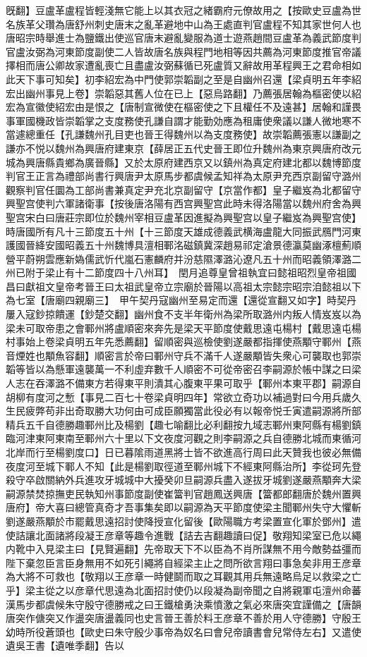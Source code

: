 旣翻】豆盧革盧程皆輕淺無它能上以其衣冠之緒霸府元僚故用之【按歐史豆盧為世名族革父瓚為唐舒州刺史唐末之亂革避地中山為王處直判官盧程不知其家世何人也唐昭宗時舉進士為鹽鐵出使巡官唐末避亂變服為道士遊燕趙間豆盧革為義武節度判官盧汝弼為河東節度副使二人皆故唐名族與程門地相等因共薦為河東節度推官帝議擇相而唐公卿故家遭亂喪亡且盡盧汝弼蘇循已死盧質又辭故用革程興王之君命相如此天下事可知矣】初李紹宏為中門使郭崇韜副之至是自幽州召還【梁貞明五年李紹宏出幽州事見上卷】崇韜惡其舊人位在已上【惡烏路翻】乃薦張居翰為樞密使以紹宏為宣徽使紹宏由是恨之【唐制宣微使在樞密使之下且權任不及遠甚】居翰和謹畏事軍國機政皆崇韜掌之支度務使孔謙自謂才能勤効應為租庸使衆議以謙人微地寒不當遽總重任【孔謙魏州孔目吏也晉王得魏州以為支度務使】故崇韜薦張憲以謙副之謙亦不悦以魏州為興唐府建東京【薛居正五代史晉王即位升魏州為東京興唐府改元城為興唐縣貴鄉為廣晉縣】又於太原府建西京又以鎮州為真定府建北都以魏博節度判官王正言為禮部尚書行興唐尹太原馬步都虞候孟知祥為太原尹充西京副留守潞州觀察判官任圜為工部尚書兼真定尹充北京副留守【京當作都】皇子繼岌為北都留守興聖宫使判六軍諸衛事【按後唐洛陽有西宫興聖宫此時未得洛陽當以魏州府舍為興聖宫宋白曰唐莊宗即位於魏州宰相豆盧革因進擬為興聖宫以皇子繼岌為興聖宫使】時唐國所有凡十三節度五十州【十三節度天雄成德義武横海盧龍大同振武鴈門河東護國晉絳安國昭義五十州魏博具澶相鄆洺磁鎮冀深趙易祁定滄景德瀛莫幽涿檀薊順營平蔚朔雲應新媯儒武忻代嵐石憲麟府并汾慈隰澤潞沁遼凡五十州而昭義領澤潞二州已附于梁止有十二節度四十八州耳】　閏月追尊皇曾祖執宜曰懿祖昭烈皇帝祖國昌曰獻祖文皇帝考晉王曰太祖武皇帝立宗廟於晉陽以高祖太宗懿宗昭宗洎懿祖以下為七室【唐廟四親廟三】　甲午契丹寇幽州至易定而還【還從宣翻又如字】時契丹屢入寇鈔掠饋運【鈔楚交翻】幽州食不支半年衛州為梁所取潞州内叛人情岌岌以為梁未可取帝患之會鄆州將盧順密來奔先是梁天平節度使戴思遠屯楊村【戴思遠屯楊村事始上卷梁貞明五年先悉薦翻】留順密與巡檢使劉遂嚴都指揮使燕顒守鄆州【燕音煙姓也顒魚容翻】順密言於帝曰鄆州守兵不滿千人遂嚴顒皆失衆心可襲取也郭崇韜等皆以為懸軍遠襲萬一不利虛弃數千人順密不可從帝密召李嗣源於帳中謀之曰梁人志在吞澤潞不備東方若得東平則潰其心腹東平果可取乎【鄆州本東平郡】嗣源自胡柳有度河之慙【事見二百七十卷梁貞明四年】常欲立奇功以補過對曰今用兵歲久生民疲弊苟非出奇取勝大功何由可成臣願獨當此役必有以報帝悦壬寅遣嗣源將所部精兵五千自德勝趣鄆州比及楊劉【趣七喻翻比必利翻按九域志鄆州東阿縣有楊劉鎮臨河津東阿東南至鄆州六十里以下文夜度河觀之則李嗣源之兵自德勝北城而東循河北岸而行至楊劉度口】日已暮隂雨道黑將士皆不欲進高行周曰此天贊我也彼必無備夜度河至城下鄆人不知【此是楊劉取徑道至鄆州城下不經東阿縣治所】李從珂先登殺守卒啟關納外兵進攻牙城城中大擾癸卯旦嗣源兵盡入遂拔牙城劉遂嚴燕顒奔大梁嗣源禁焚掠撫吏民執知州事節度副使崔簹判官趙鳳送興唐【簹都郎翻唐於魏州置興唐府】帝大喜曰總管真奇才吾事集矣即以嗣源為天平節度使梁主聞鄆州失守大懼斬劉遂嚴燕顒於市罷戴思遠招討使降授宣化留後【歐陽職方考梁置宣化軍於鄧州】遣使詰讓北面諸將段凝王彦章等趣令進戰【詰去吉翻趣讀曰促】敬翔知梁室已危以繩内靴中入見梁主曰【見賢遍翻】先帝取天下不以臣為不肖所謀無不用今敵勢益彊而陛下棄忽臣言臣身無用不如死引繩將自經梁主止之問所欲言翔曰事急矣非用王彦章為大將不可救也【敬翔以王彦章一時健鬬而取之耳觀其用兵無遠略烏足以救梁之亡乎】梁主從之以彦章代思遠為北面招討使仍以段凝為副帝聞之自將親軍屯澶州命蕃漢馬步都虞候朱守殷守德勝戒之曰王鐵槍勇決乘憤激之氣必來唐突宜謹備之【唐韻唐突作傏突又作盪突唐盪義同也史言晉王善於料王彦章不善於用人守德勝】守殷王幼時所役蒼頭也【歐史曰朱守殷少事帝為奴名曰會兒帝讀書會兒常侍左右】又遣使遺吳王書【遺唯季翻】告以